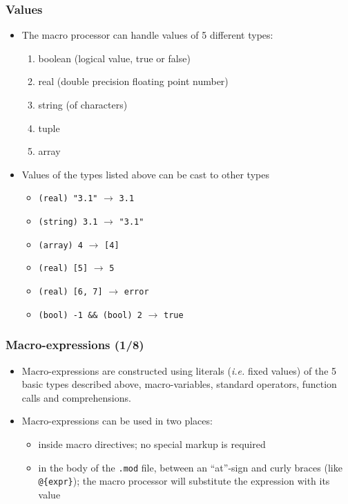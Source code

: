 \documentclass[aspectratio=169]{beamer}
\begin{document}
\begin{frame}
\frametitle{Values}
\begin{itemize}
\item The macro processor can handle values of 5 different types:
  \begin{enumerate}
  \item boolean (logical value, true or false)
  \item real (double precision floating point number)
  \item string (of characters)
  \item tuple
  \item array
  \end{enumerate}
\item Values of the types listed above can be cast to other types
  \begin{itemize}
  \item \texttt{(real) "3.1"} $\rightarrow$ \texttt{3.1}
  \item \texttt{(string) 3.1} $\rightarrow$ \texttt{"3.1"}
  \item \texttt{(array) 4} $\rightarrow$ \texttt{[4]}
  \item \texttt{(real) [5]} $\rightarrow$ \texttt{5}
  \item \texttt{(real) [6, 7]} $\rightarrow$ \texttt{error}
  \item \texttt{(bool) -1 \&\& (bool) 2} $\rightarrow$ \texttt{true}
  \end{itemize}
\end{itemize}
\end{frame}

\begin{frame}[fragile=singleslide]
  \frametitle{Macro-expressions (1/8)}
  \begin{itemize}
    \item Macro-expressions are constructed using literals (\textit{i.e.} fixed values) of the 5 basic types
      described above, macro-variables, standard operators, function calls and comprehensions.
    \item Macro-expressions can be used in two places:
      \begin{itemize}
      \item inside macro directives; no special markup is required
      \item in the body of the \texttt{.mod} file, between an ``at''-sign and curly braces (like \verb+@{expr}+); the macro processor will substitute the expression with its value
      \end{itemize}
  \end{itemize}
\end{frame}
\end{document}
